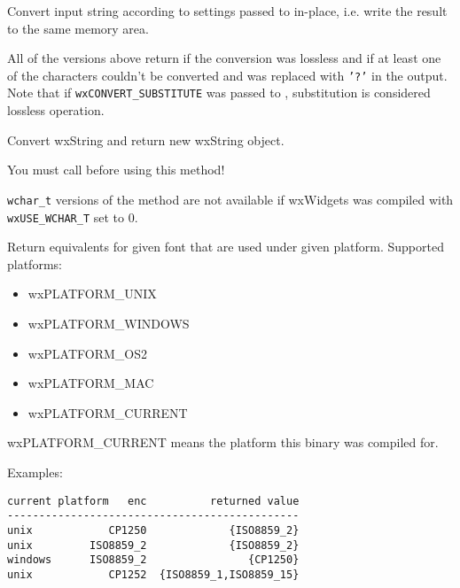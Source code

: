 Convert input string according to settings passed to
 in-place, i.e. write the result to the
same memory area.

All of the versions above return \true if the conversion was lossless and
\false if at least one of the characters couldn't be converted and was replaced
with {\tt '?'} in the output. Note that if {\tt wxCONVERT\_SUBSTITUTE} was
passed to , substitution is considered
lossless operation.


Convert wxString and return new wxString object.


You must call  before using this method!

{\tt wchar\_t} versions of the method are not available if wxWidgets was compiled
with {\tt wxUSE\_WCHAR\_T} set to 0.


\label{wxencodingconvertergetplatformequivalents}


Return equivalents for given font that are used
under given platform. Supported platforms:

\begin{itemize}\itemsep=0pt
\item wxPLATFORM\_UNIX
\item wxPLATFORM\_WINDOWS
\item wxPLATFORM\_OS2
\item wxPLATFORM\_MAC
\item wxPLATFORM\_CURRENT
\end{itemize}

wxPLATFORM\_CURRENT means the platform this binary was compiled for.

Examples:

\begin{verbatim}
current platform   enc          returned value
----------------------------------------------
unix            CP1250             {ISO8859_2}
unix         ISO8859_2             {ISO8859_2}
windows      ISO8859_2                {CP1250}
unix            CP1252  {ISO8859_1,ISO8859_15}
\end{verbatim}

